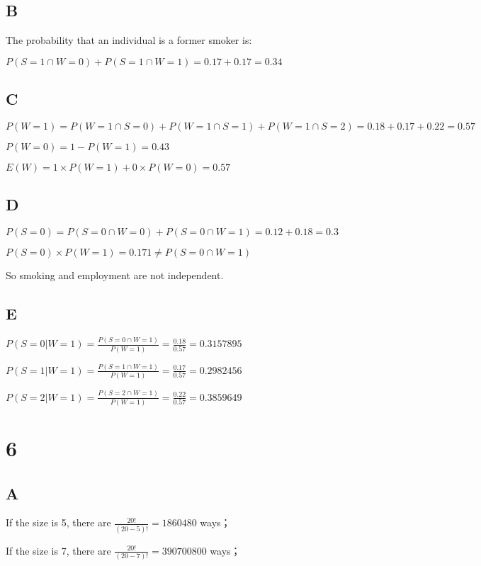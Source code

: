 \documentclass{article}
\begin{document}
	\subsection*{B}
	
	The probability that an individual is a former smoker is:
	
	$P(S=1\cap W=0)+P(S=1\cap W=1)=0.17+0.17=0.34$
	
	\subsection*{C}
	
	$P(W=1)=P(W=1\cap S=0)+P(W=1\cap S=1)+P(W=1\cap S=2)=0.18+0.17+0.22=0.57$
	
	$P(W=0)=1-P(W=1)=0.43$
	
	$E(W)=1\times P(W=1)+0\times P(W=0)=0.57$
	
	\subsection*{D}
	
	$P(S=0)=P(S=0\cap W=0)+P(S=0\cap W=1)=0.12+0.18=0.3$
	
	$P(S=0)\times P(W=1)=0.171\ne P(S=0\cap W=1)$
	
	So smoking and employment are not independent.
	
	\subsection*{E}
	
	$P(S=0|W=1)=\frac{P(S=0\cap W=1)}{P(W=1)}=\frac{0.18}{0.57}=0.3157895$
	
	$P(S=1|W=1)=\frac{P(S=1\cap W=1)}{P(W=1)}=\frac{0.17}{0.57}=0.2982456$
	
	$P(S=2|W=1)=\frac{P(S=2\cap W=1)}{P(W=1)}=\frac{0.22}{0.57}=0.3859649$
	
	\section*{6}
	
	\subsection*{A}
	
	If the size is 5, there are $\frac{20!}{(20-5)!}=1860480$
	 ways；
	 
	If the size is 7, there are $\frac{20!}{(20-7)!}=390700800$
	 ways；
	
\end{document}

